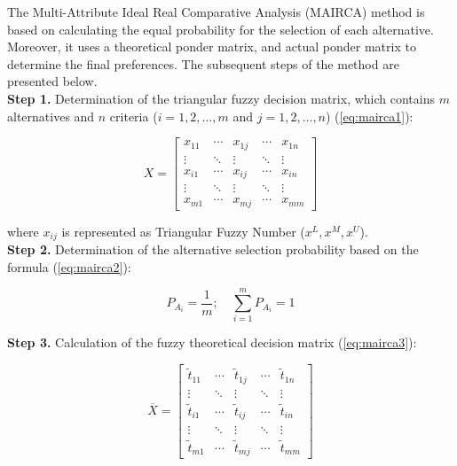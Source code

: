The Multi-Attribute Ideal Real Comparative Analysis (MAIRCA) method is based on calculating the equal probability for the selection of each alternative. Moreover, it uses a theoretical ponder matrix, and actual ponder matrix to determine the final preferences. The subsequent steps of the method are presented below. \\

\noindent \textbf{Step 1.} Determination of the triangular fuzzy decision matrix, which contains $m$ alternatives and $n$ criteria ($i = 1, 2, \ldots, m$ and $j = 1, 2, \ldots, n$) (\ref{eq:mairca1}):

\begin{equation}
X=\left[\begin{array}{ccccc}
x_{11} & \cdots & x_{1 j} & \cdots & x_{1 n} \\
\vdots & \ddots & \vdots & \ddots & \vdots \\
x_{i 1} & \cdots & x_{i j} & \cdots & x_{i n} \\
\vdots & \ddots & \vdots & \ddots & \vdots \\
x_{m 1} & \cdots & x_{m j} & \cdots & x_{m m}
\end{array}\right]
\label{eq:mairca1}
\end{equation}

\noindent where $x_{ij}$ is represented as Triangular Fuzzy Number ($x^L, x^M, x^U$). \\

\noindent \textbf{Step 2.} Determination of the alternative selection probability based on the formula (\ref{eq:mairca2}):

\begin{equation}
P_{A_{i}} = \frac{1}{m}; \quad \sum_{i=1}^{m} P_{A_{i}} = 1
\label{eq:mairca2}
\end{equation}

\noindent \textbf{Step 3.} Calculation of the fuzzy theoretical decision matrix (\ref{eq:mairca3}):

\begin{equation}
\overline{X}=\left[\begin{array}{ccccc}
\tilde{t}_{11} & \cdots & \tilde{t}_{1 j} & \cdots & \tilde{t}_{1 n} \\
\vdots & \ddots & \vdots & \ddots & \vdots \\
\tilde{t}_{i 1} & \cdots & \tilde{t}_{i j} & \cdots & \tilde{t}_{i n} \\
\vdots & \ddots & \vdots & \ddots & \vdots \\
\tilde{t}_{m 1} & \cdots & \tilde{t}_{m j} & \cdots & \tilde{t}_{m m}
\end{array}\right]
\label{eq:mairca3}
\end{equation}

